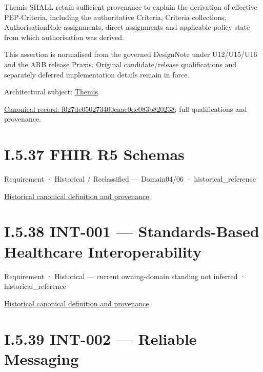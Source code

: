 Themis SHALL retain sufficient provenance to explain the derivation of effective PEP-Criteria, including the authoritative Criteria, Criteria collections, AuthorisationRole assignments, direct assignments and applicable policy state from which authorisation was derived.



This assertion is normalised from the governed DesignNote under U12/U15/U16 and the ARB release Praxis. Original candidate/release qualifications and separately deferred implementation details remain in force.



Architectural subject: \hyperref[element:899d34ec491948b68aad09e507dea6d1]{Themis}.


{\footnotesize \href{../../../../continuum/motivation/requirement/f027de050273400eaac0de083b820238.md}{Canonical record: f027de050273400eaac0de083b820238}; full qualifications and provenance.}\par
\section*{I.5.37 FHIR R5 Schemas}
\label{navigation:I.5.37}

\label{element:8d8c62b8cb7b40b0be2ce23f7f41f154}
{\small Requirement · Historical / Reclassified — Domain04/06 · historical\_reference}\par
\href{../../../../continuum/motivation/requirement/8d8c62b8cb7b40b0be2ce23f7f41f154.md}{Historical canonical definition and provenance}.\par
\section*{I.5.38 INT-001 — Standards-Based Healthcare Interoperability}
\label{navigation:I.5.38}

\label{element:44dba056ada04f6583b77859aac9ac68}
{\small Requirement · Historical — current owning-domain standing not inferred · historical\_reference}\par
\href{../../../../continuum/motivation/requirement/44dba056ada04f6583b77859aac9ac68.md}{Historical canonical definition and provenance}.\par
\section*{I.5.39 INT-002 — Reliable Messaging}
\label{navigation:I.5.39}

